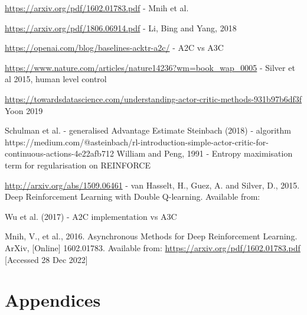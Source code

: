 \documentclass{article}
\begin{document}
\url{https://arxiv.org/pdf/1602.01783.pdf} - Mnih et al.

\url{https://arxiv.org/pdf/1806.06914.pdf} - Li, Bing and Yang, 2018

\url{https://openai.com/blog/baselines-acktr-a2c/} - A2C vs A3C

\url{https://www.nature.com/articles/nature14236?wm=book_wap_0005} - Silver et al 2015, human level control

\url{https://towardsdatascience.com/understanding-actor-critic-methods-931b97b6df3f} Yoon 2019

Schulman et al. - generalised Advantage Estimate
Steinbach (2018) - algorithm https://medium.com/@asteinbach/rl-introduction-simple-actor-critic-for-continuous-actions-4e22afb712
William and Peng, 1991 - Entropy maximisation term for regularisation on REINFORCE

\url{http://arxiv.org/abs/1509.06461} - van Hasselt, H., Guez, A. and Silver, D., 2015. Deep Reinforcement Learning with Double Q-learning. Available from: 

Wu et al. (2017) - A2C implementation vs A3C

\small

Mnih, V., et al., 2016. Asynchronous Methods for Deep Reinforcement Learning. ArXiv, [Online] 1602.01783.
Available from: \url{https://arxiv.org/pdf/1602.01783.pdf} [Accessed 28 Dec 2022]

\normalsize
\newpage
\section*{Appendices}
\end{document}
